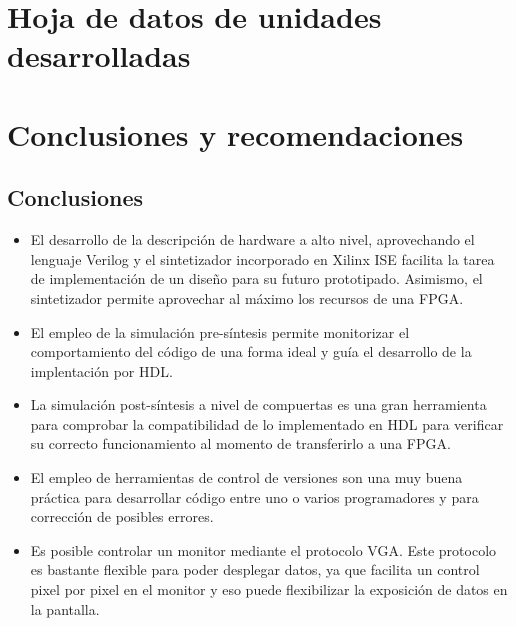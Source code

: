 \documentclass[12pt,a4paper]{article}
\begin{document}
\section{Hoja de datos de unidades desarrolladas}


\section{Conclusiones y recomendaciones}
\subsection{Conclusiones}
\begin{itemize}
    \item El desarrollo de la descripción de hardware a alto nivel, aprovechando el lenguaje Verilog y el sintetizador incorporado en Xilinx ISE facilita la tarea de implementación de un diseño para su futuro prototipado. Asimismo, el sintetizador permite aprovechar al máximo los recursos de una FPGA.
    \item El empleo de la simulación pre-síntesis permite monitorizar el comportamiento del código de una forma ideal y guía el desarrollo de la implentación por HDL.
    \item La simulación post-síntesis a nivel de compuertas es una gran herramienta para comprobar la compatibilidad de lo implementado en HDL para verificar su correcto funcionamiento al momento de transferirlo a una FPGA.
    \item El empleo de herramientas de control de versiones son una muy buena práctica para desarrollar código entre uno o varios programadores y para corrección de posibles errores.
    \item Es posible controlar un monitor mediante el protocolo VGA. Este protocolo es bastante flexible para poder desplegar datos, ya que facilita un control pixel por pixel en el monitor y eso puede flexibilizar la exposición de datos en la pantalla.
\end{itemize}
\end{document}
